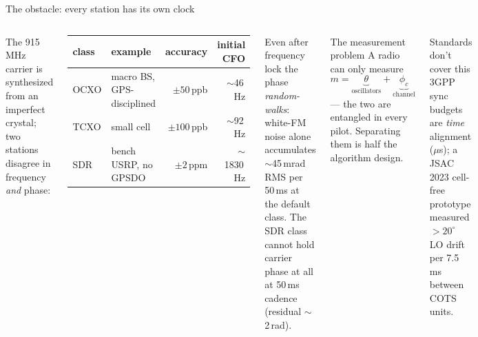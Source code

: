 \documentclass[aspectratio=169,10pt]{beamer}
\begin{document}
\begin{frame}{The obstacle: every station has its own clock}
  \begin{columns}[T]
    \small The 915\,MHz carrier is synthesized from an imperfect
    crystal; two stations disagree in frequency \emph{and} phase:
    \begin{center}\scriptsize
    \begin{tabular}{@{}llrr@{}}
      \toprule
      class & example & accuracy & initial CFO \\
      \midrule
      OCXO & macro BS, GPS-disciplined & $\pm50$\,ppb & $\sim$46\,Hz \\
      TCXO & small cell & $\pm100$\,ppb & $\sim$92\,Hz \\
      SDR  & bench USRP, no GPSDO & $\pm2$\,ppm & $\sim$1830\,Hz \\
      \bottomrule
    \end{tabular}
    \end{center}
    \small Even after frequency lock the phase \emph{random-walks}:
    white-FM noise alone accumulates $\sim$45\,mrad RMS per 50\,ms at
    the default class. The SDR class cannot hold carrier phase at all
    at 50\,ms cadence (residual $\sim$2\,rad).
    \begin{block}{\small The measurement problem}
      \small A radio can only measure
      \[
        m = \underbrace{\theta}_{\text{oscillators}}
          + \underbrace{\phi_c}_{\text{channel}}
      \]
      --- the two are entangled in every pilot. Separating them is
      half the algorithm design.
    \end{block}
    \begin{block}{\small Standards don't cover this}
      \small 3GPP sync budgets are \emph{time} alignment
      ($\mu$s); a JSAC 2023 cell-free prototype measured
      $>20^\circ$ LO drift per 7.5\,ms between COTS units.
    \end{block}
  \end{columns}
\end{frame}
\end{document}
